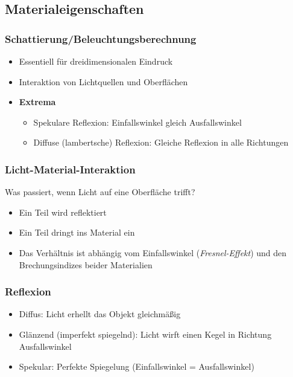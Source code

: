 \subsection{Materialeigenschaften}

\subsubsection{Schattierung/Beleuchtungsberechnung}
\begin{itemize}
	\item Essentiell für dreidimensionalen Eindruck
	\item Interaktion von Lichtquellen und Oberflächen
	\item \textbf{Extrema}
	\begin{itemize}
		\item Spekulare Reflexion: Einfallswinkel gleich Ausfallswinkel
		\item Diffuse (lambertsche) Reflexion: Gleiche Reflexion in alle Richtungen
	\end{itemize}
\end{itemize}

\subsubsection{Licht-Material-Interaktion}
Was passiert, wenn Licht auf eine Oberfläche trifft?
\begin{itemize}
	\item Ein Teil wird reflektiert
	\item Ein Teil dringt ins Material ein
	\item Das Verhältnis ist abhängig vom Einfallswinkel (\textit{Fresnel-Effekt}) und den Brechungsindizes beider Materialien
\end{itemize}

\subsubsection{Reflexion}
\begin{itemize}
	\item Diffus: Licht erhellt das Objekt gleichmäßig
	\item Glänzend (imperfekt spiegelnd): Licht wirft einen Kegel in Richtung Ausfallswinkel
	\item Spekular: Perfekte Spiegelung (Einfallswinkel = Ausfallswinkel)
\end{itemize}

